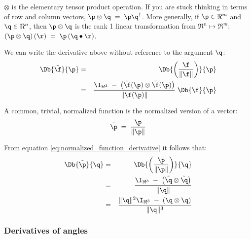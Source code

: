 $\otimes$ is the elementary tensor product operation.
If you are stuck thinking in terms of row and column vectors,
$\p \otimes \q \;= \;\p\q^\dagger$.
More generally, if $\p \in \Re^m$ and $\q \in \Re^n$,
then $\p \otimes \q$ is the rank 1 linear transformation from $\Re^n \mapsto \Re^m$:
$\left(\p \otimes \q\right) (\r) \;= \;\p \left(\q \bullet \r\right)$.

We can write the derivative above without reference to the argument $\q$:
\begin{eqnarray}
\label{eq:normalized_function_derivative}
\Db{\tilde{\f}}{\p}
& = &
\Db{\left({\f \over {\| \f \|}}\right)}{\p}  \\
& = &
{{\I_{\Re^3} \;- \;\left( \tilde{\f}(\p) \otimes \tilde{\f}(\p) \right) }
\over {\| \f(\p) \|} }
\;\Db{\f}{\p} \nonumber
\end{eqnarray}

A common, trivial, normalized function is the normalized version of
a vector:
\begin{equation}
\tilde{\p} \;= \;{{\p} \over {\| \p \|}}
\end{equation}

From equation \ref{eq:normalized_function_derivative}
it follows that:
\begin{eqnarray}
\label{eq:normalized_vector_derivative}
\Db{\tilde{\p}}{\q}
& = &
\Db{\left({\p \over {\| \p \|}}\right)}{\q}
\\
& = &
{{\I_{\Re^3} \;- \;\left( \tilde{\q} \otimes \tilde{\q} \right) }
\over {\| \q \|} }
\nonumber
\\
& = &
{{\| \q \|^2 \I_{\Re^3} \;- \;\left( \q \otimes \q \right) }
\over {\| \q \|^3} }
\nonumber
\end{eqnarray}


\subsubsection{Derivatives of angles}
\label{sec:derivatives-of-angles}

